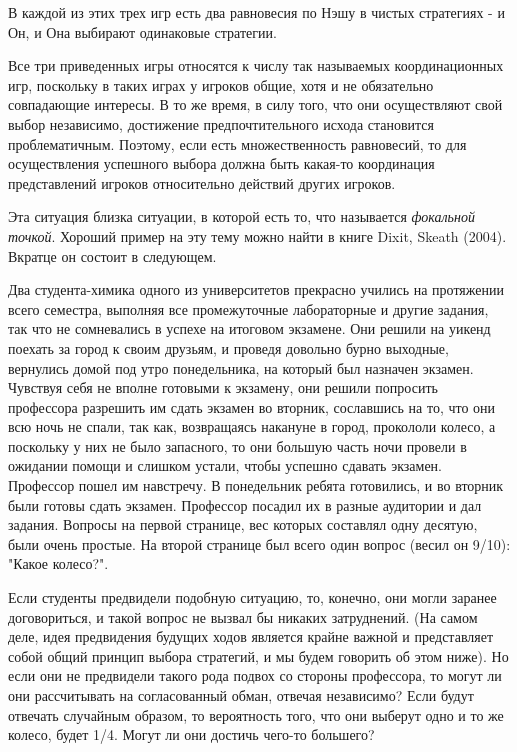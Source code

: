 \documentclass[12pt]{article}
\begin{document}
{В каждой из этих трех игр есть два равновесия по Нэшу в чистых
стратегиях - и Он, и Она выбирают одинаковые стратегии.

Все три приведенных игры относятся к числу так называемых
координационных игр, поскольку в таких играх у игроков общие,
хотя и не обязательно совпадающие интересы. В то же время, в силу
того, что они осуществляют свой выбор независимо, достижение
предпочтительного исхода становится проблематичным. Поэтому, если
есть множественность равновесий, то для осуществления успешного
выбора должна быть какая-то координация представлений игроков
относительно действий других игроков.

Эта ситуация близка ситуации, в которой есть то, что называется
\emph{фокальной точкой}. Хороший пример на эту тему можно найти
в книге Dixit, Skeath (2004). Вкратце он состоит в следующем.

Два студента-химика одного из университетов прекрасно учились на
протяжении всего семестра, выполняя все промежуточные лабораторные
и другие задания, так что не сомневались в успехе на итоговом экзамене.
Они решили на уикенд поехать за город к своим друзьям,
и проведя довольно бурно выходные, вернулись домой под утро понедельника,
на который был назначен экзамен. Чувствуя себя не вполне готовыми к экзамену,
они решили попросить профессора разрешить им сдать экзамен во вторник,
сославшись на то, что они всю ночь не спали, так как, возвращаясь накануне
в город, прокололи колесо, а поскольку у них не было запасного, то они большую
часть ночи провели в ожидании помощи и слишком устали, чтобы успешно
сдавать экзамен. Профессор пошел им навстречу. В понедельник ребята готовились,
и во вторник были готовы сдать экзамен. Профессор посадил их
в разные аудитории и дал задания. Вопросы на первой странице, вес которых
составлял одну десятую, были очень простые. На второй странице был всего один
вопрос (весил он 9/10): "Какое колесо?".

Если студенты предвидели подобную ситуацию, то, конечно, они могли заранее
договориться, и такой вопрос не вызвал бы никаких затруднений. (На самом
деле, идея предвидения будущих ходов является крайне важной и представляет
собой общий принцип выбора стратегий, и мы будем говорить об этом ниже).
Но если они не предвидели такого рода подвох со стороны профессора, то
могут ли они рассчитывать на согласованный обман, отвечая независимо? Если
будут отвечать случайным образом, то вероятность того, что они выберут одно
и то же колесо, будет 1/4. Могут ли они достичь чего-то большего?

}
\end{document}
